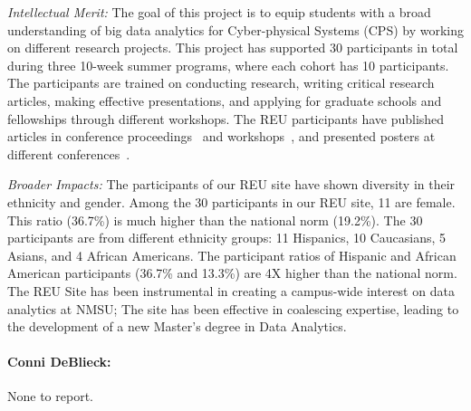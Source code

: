 \noindent\textit{Intellectual Merit:} 
The goal of this project is to equip students with a broad understanding of big data analytics for Cyber-physical Systems (CPS) by working on different research projects. This project has supported 30 participants in total during three 10-week summer programs, where each cohort has 10 participants. The participants are trained on conducting research, writing critical research articles, making effective presentations, and applying for graduate schools and fellowships through different workshops. 
The REU participants have published articles in conference proceedings~\cite{reu2,reu3} and workshops~\cite{reu1,reu7}, and presented posters at different conferences~\cite{reu4,reu5,reu6,reu10}.


\noindent\textit{Broader Impacts:} 
The participants of our REU site have shown diversity in their ethnicity and gender.
Among the 30 participants in our REU site, 11 are female. 
This ratio (36.7\%) is much higher than the national norm (19.2\%). 
%
The 30 participants are from different ethnicity groups: 11 Hispanics, 10 Caucasians,  5 Asians, and 4 African Americans.  The participant ratios of  Hispanic and African American participants  (36.7\% and 13.3\%) are 4X higher than the national norm. The REU Site has been instrumental in creating a campus-wide interest on data analytics at NMSU; The site has  been effective in coalescing expertise, leading to  the development of a new Master's degree in Data Analytics.

\paragraph{Conni DeBlieck:} None to report.

